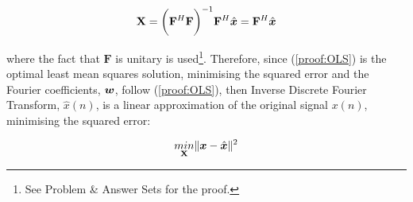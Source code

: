 \begin{enumerate}[label=\alph*), leftmargin=*]
\begin{equation}
    \mathbf{X} = \bigg( \mathbf{F}^{H} \mathbf{F} \bigg)^{-1} \mathbf{F}^{H} \hat{{\bm{x}}} = \mathbf{F}^{H} \hat{{\bm{x}}}
\label{proof:DFT_as_OLS}
\end{equation}

where the fact that $\mathbf{F}$ is unitary is used\footnote{See Problem \& Answer Sets for the proof.}.
Therefore, since (\ref{proof:OLS}) is the optimal least mean squares solution, minimising the squared error and the Fourier coefficients, ${\bm{w}}$, follow (\ref{proof:OLS}),
then Inverse Discrete Fourier Transform, $\hat{x}(n)$, is a linear approximation of the original signal $x(n)$, minimising the squared error:

\begin{equation}
    \underset{\mathbf{X}}{min} \| {\bm{x}} - \hat{{\bm{x}}} \|^{2}
\end{equation}








\end{enumerate}
